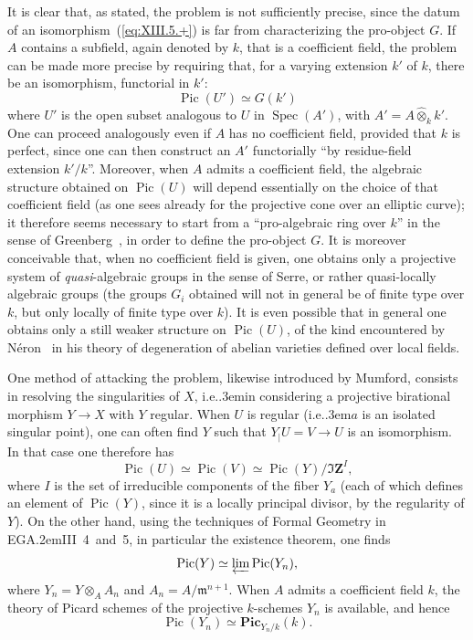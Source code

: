 \documentclass[11pt,a4paper,oneside]{book}
\providecommand{\sisi}[2]{#2}
\providecommand{\pageoriginale}{%
  \refstepcounter{pageoriginal}%
  \marginpar{\raggedright\footnotesize\bfseries\thepageoriginal}%
  \xspace}
\providecommand{\og}{``}
\providecommand{\fg}{''\xspace}
\providecommand{\ie}{i.e.\kern.3em}
\providecommand{\EGA}{\textup{EGA}\kern.2em}
\providecommand{\ZZ}{\mathbf Z}
\providecommand{\ideal}[1]{\mathfrak{#1}}
\providecommand{\mm}{\ideal m}
\providecommand{\Spec}{\operatorname{Spec}}
\providecommand{\Pic}{\operatorname{Pic}}
\let\pageoriginaled\pageoriginale
\theoremstyle{plain}
\theoremstyle{definition}
\theoremstyle{remark}
\renewcommand{\Ref}[1]{\textup{\ref{#1}}}
\begin{document}
It is clear that, as stated, the problem is not sufficiently precise, since the datum of an isomorphism~(\Ref{eq:XIII.5.+}) is far from characterizing the pro-object $G$. If $A$ contains a subfield, again denoted by $k$, that is a coefficient field, the problem can be made more precise by requiring that, for a varying extension $k'$ of $k$, there be an isomorphism, functorial in $k'$:
\begin{equation*} \label{eq:XIII.5.+'} \tag{$+'$} {\Pic(U')\simeq G(k')} \end{equation*}
where $U'$ is the open subset analogous to $U$ in $\Spec(A')$, with $A'=A\hat{\otimes}_k k'$. One can proceed analogously even if $A$ has no coefficient field, provided that $k$ is perfect, since one can then construct an $A'$ functorially \og by residue-field extension $k'/k$\fg. Moreover, when $A$ admits a coefficient field, the algebraic structure obtained on $\Pic(U)$ will depend essentially on the choice of that coefficient field (as one sees already for the projective cone over an elliptic curve); it therefore seems necessary to start from a \og pro-algebraic ring over $k$\fg in the sense of \sisi{GREENBERG}{Greenberg}~\cite{XIII.3}, in order to define the pro-object $G$. It is moreover conceivable that, when no coefficient field is given, one obtains only a projective system of\pageoriginaled \emph{quasi}-algebraic groups in the sense of Serre, or rather quasi-locally algebraic groups (the groups $G_i$ obtained will not in general be of finite type over $k$, but only locally of finite type over $k$). It is even possible that in general one obtains only a still weaker structure on $\Pic(U)$, of the kind encountered by \sisi{NERON}{N\'eron}~\cite{XIII.6} in his theory of degeneration of abelian varieties defined over local fields.

One method of attacking the problem, likewise introduced by \sisi{MUMFORD}{Mumford}, consists in resolving the singularities of $X$, \ie in considering a projective birational morphism $Y\to X$ with $Y$ regular. When $U$ is regular (\ie $a$ is an isolated singular point), one can often find $Y$ such that $Y\sisi{|U}{_|U}=V\to U$ is an isomorphism. In that case one therefore has
$$
\Pic(U)\simeq\Pic(V)\simeq\Pic(Y)/\Im \ZZ^I,
$$
where $I$ is the set of irreducible components of the fiber $Y_{a}$\sisi{, }{} (each of which defines an element of $\Pic(Y)$, since it is a locally principal divisor, by the regularity of $Y$). On the other hand, using the techniques of Formal Geometry in \EGA III~4~and~5, in particular the existence theorem, one finds
$$
\Pic(Y)\simeq\varprojlim\Pic(Y_n),
$$
where $Y_n=Y\otimes_A A_n$ and $A_n=A/\mm^{n+1}$. When $A$ admits a coefficient field $k$, the theory of Picard schemes of the projective $k$-schemes $Y_n$ is available, and hence
$$
\Pic(Y_n)\simeq \mathbf{Pic}_{Y_n/k}(k).
$$
\end{document}
